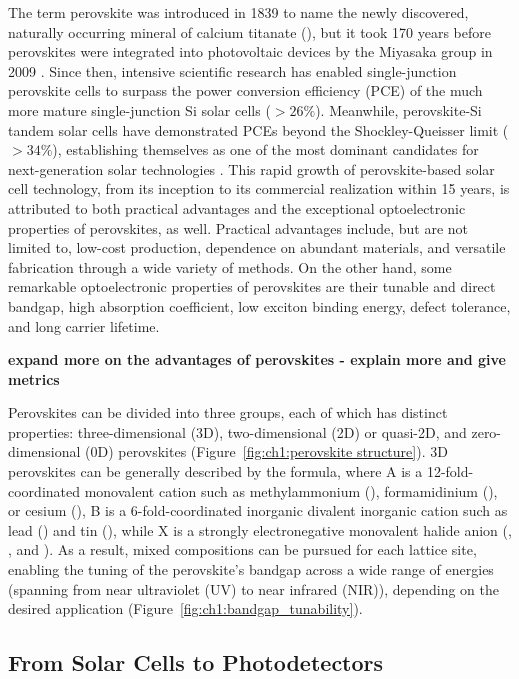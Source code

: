 The term perovskite was introduced in 1839 to name the newly discovered, naturally occurring mineral of calcium titanate (), but it took 170 years before perovskites were integrated into photovoltaic devices by the Miyasaka group in 2009 \cite{Kojima2009OrganometalCells}. Since then, intensive scientific research has enabled single-junction perovskite cells to surpass the power conversion efficiency (PCE) of the much more mature single-junction Si solar cells ($> 26\%$). Meanwhile, perovskite-Si tandem solar cells have demonstrated PCEs beyond the Shockley-Queisser limit ($>34\%$), establishing themselves as one of the most dominant candidates for next-generation solar technologies \cite{Hasan2024StabilityReview, Noman2024ATechnology}. This rapid growth of perovskite-based solar cell technology, from its inception to its commercial realization within 15 years, is attributed to both practical advantages and the exceptional optoelectronic properties of perovskites, as well. Practical advantages include, but are not limited to, low-cost production, dependence on abundant materials, and versatile fabrication through a wide variety of methods. On the other hand, some remarkable optoelectronic properties of perovskites are their tunable and direct bandgap, high absorption coefficient, low exciton binding energy, defect tolerance, and long carrier lifetime. 

\textbf{expand more on the advantages of perovskites - explain more and give metrics}

Perovskites can be divided into three groups, each of which has distinct properties: three-dimensional (3D), two-dimensional (2D) or quasi-2D, and zero-dimensional (0D) perovskites (Figure~\ref{fig:ch1:perovskite structure}). 3D perovskites can be generally described by the  formula, where A is a 12-fold-coordinated monovalent cation such as methylammonium (), formamidinium (), or cesium (), B is a 6-fold-coordinated inorganic divalent inorganic cation such as lead () and tin (), while X is a strongly electronegative monovalent halide anion (, , and ). As a result, mixed compositions can be pursued for each lattice site, enabling the tuning of the perovskite's bandgap across a wide range of energies (spanning from near ultraviolet (UV) to near infrared (NIR)), depending on the desired application (Figure~\ref{fig:ch1:bandgap_tunability}).

\subsection{From Solar Cells to Photodetectors}


